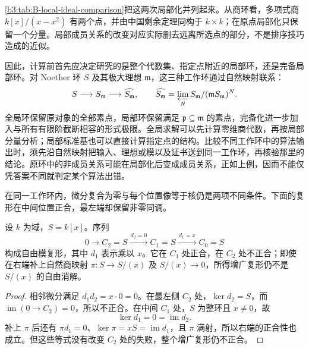 \cref{b3:tab:B-local-ideal-comparison}把这两次局部化并列起来。从商环看，多项式商 \(k[x]/(x-x^2)\) 有两个点，并由中国剩余定理同构于 \(k\times k\)；在原点局部化只保留一个分量。局部成员关系的改变对应实际删去远离所选点的部分，不是排序技巧造成的近似。

\ProseParagraphBreak
因此，计算前首先应决定研究的是整个代数集、指定点附近的局部环，还是完备局部环。对 Noether 环 \(S\) 及其极大理想 \(\mathfrak m\)，这三种工作环通过自然映射联系：
\[
	S\longrightarrow S_{\mathfrak m}\longrightarrow\widehat{S_{\mathfrak m}}, \qquad \widehat{S_{\mathfrak m}} =\varprojlim_N S_{\mathfrak m}/(\mathfrak mS_{\mathfrak m})^N.
\]
全局环保留原对象的全部素点，局部环保留满足 \(\mathfrak p\subseteq\mathfrak m\) 的素点，完备化进一步加入与所有有限阶截断相容的形式极限。全局求解可以先计算零维商代数，再按局部分量分析；局部标准基也可以直接计算指定点的结构。比较不同工作环中的算法输出时，须先沿自然映射把输入、理想或模以及证书送到同一工作环，再核验那里的结论。原环中的非成员关系可能在局部化后变成成员关系，正如上例，因而不能仅凭答案不同就判定某个算法出错。

\ProseParagraphBreak
在同一工作环内，微分复合为零与每个位置像等于核仍是两项不同条件。下面的复形在中间位置正合，最左端却保留非零同调。

\begin{proposition}[复形条件与正合性]\label{b3:prop:B-complex-not-resolution}
	设 \(k\) 为域，\(S=k[x]\)。序列
	\[
		0\longrightarrow C_2=S\xrightarrow{\,d_2=0\,} C_1=S\xrightarrow{\,d_1=x\,}C_0=S
	\]
	构成自由模复形，其中 \(d_1\) 表示乘以 \(x\)。它在 \(C_1\) 处正合，在 \(C_2\) 处不正合；即使在右端补上自然商映射 \(\pi:S\to S/(x)\) 及 \(S/(x)\to0\)，所得增广复形仍不是 \(S/(x)\) 的自由消解。
\end{proposition}
\begin{proof}
	相邻微分满足 \(d_1d_2=x\cdot0=0\)。在最左侧 \(C_2\) 处，\(\ker d_2=S\)，而 \(\operatorname{im}(0\to C_2)=0\)，所以不正合。在中间 \(C_1\) 处，\(S\) 为整环且 \(x\ne0\)，故
	\[
		\ker d_1=0=\operatorname{im}d_2.
	\]
	补上 \(\pi\) 后还有 \(\pi d_1=0\)、\(\ker\pi=xS=\operatorname{im}d_1\)，且 \(\pi\) 满射，所以右端的正合性也成立。但这些等式没有改变 \(C_2\) 处的失败，整个增广复形仍不正合。
\end{proof}
